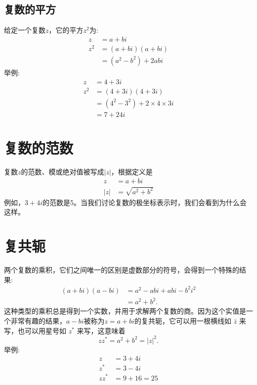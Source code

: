 \subsection{复数的平方}
给定一个复数$z$，它的平方$z^{2}$为:
$$
\begin{aligned}
z & =a+b i \\
z^{2} & =(a+b i)(a+b i) \\
& =\left(a^{2}-b^{2}\right)+2 a b i
\end{aligned}
$$
举例:
$$
\begin{aligned}
z & =4+3 i \\
z^{2} & =(4+3 i)(4+3 i) \\
& =\left(4^{2}-3^{2}\right)+2 \times 4 \times 3 i \\
& =7+24 i
\end{aligned}
$$

\section{复数的范数}
复数$z$的范数、模或绝对值被写成$|z|$，根据定义是
$$
\begin{aligned}
z & =a+b i \\
|z| & =\sqrt{a^{2}+b^{2}}
\end{aligned}
$$
例如，$3+ 4i $的范数是5。当我们讨论复数的极坐标表示时，我们会看到为什么会这样。

\section{复共轭}
两个复数的乘积，它们之间唯一的区别是虚数部分的符号，会得到一个特殊的结果:
$$
\begin{aligned}
(a+b i)(a-b i) & =a^{2}-a b i+a b i-b^{2} i^{2} \\
& =a^{2}+b^{2} .
\end{aligned}
$$
这种类型的乘积总是得到一个实数，并用于求解两个复数的商。因为这个实值是一个非常有趣的结果，$a-b i$被称为$z=a+ bi $的复共轭，它可以用一根横线如 $\bar{z}$ 来写，也可以用星号如 $z^{*}$ 来写，这意味着
$$
z z^{*}=a^{2}+b^{2}=|z|^{2} .
$$
举例:
$$
\begin{aligned}
z & =3+4 i \\
z^{*} & =3-4 i \\
z z^{*} & =9+16=25
\end{aligned}
$$

